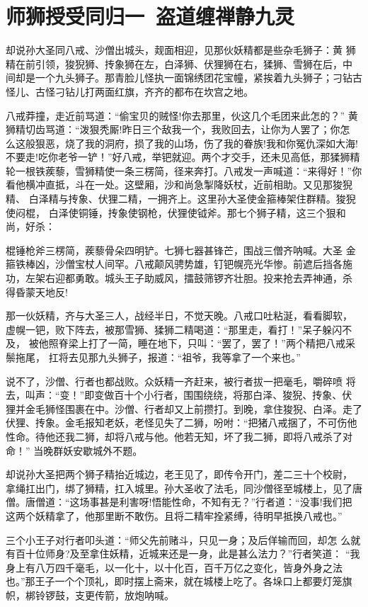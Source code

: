 \chapter{师狮授受同归一~盗道缠禅静九灵}

却说孙大圣同八戒、沙僧出城头，觌面相迎，见那伙妖精都是些杂毛狮子：黄
狮精在前引领，狻猊狮、抟象狮在左，白泽狮、伏狸狮在右，猱狮、雪狮在后，中
间却是一个九头狮子。那青脸儿怪执一面锦绣团花宝幢，紧挨着九头狮子；刁钻古
怪儿、古怪刁钻儿打两面红旗，齐齐的都布在坎宫之地。

八戒莽撞，走近前骂道：“偷宝贝的贼怪!你去那里，伙这几个毛团来此怎的？”
黄狮精切齿骂道：“泼狠秃厮!昨日三个敌我一个，我败回去，让你为人罢了；你怎
么这般狠恶，烧了我的洞府，损了我的山场，伤了我的眷族!我和你冤仇深如大海!
不要走!吃你老爷一铲！”好八戒，举钯就迎。两个才交手，还未见高低，那猱狮精
轮一根铁蒺藜，雪狮精使一条三楞简，径来奔打。八戒发一声喊道：“来得好！”你
看他横冲直抵，斗在一处。这壁厢，沙和尚急掣降妖杖，近前相助。又见那狻猊精、
白泽精与抟象、伏狸二精，一拥齐上。这里孙大圣使金箍棒架住群精。狻猊使闷棍，
白泽使铜锤，抟象使钢枪，伏狸使钺斧。那七个狮子精，这三个狠和尚，好杀：

棍锤枪斧三楞简，蒺藜骨朵四明铲。七狮七器甚锋芒，围战三僧齐呐喊。大圣
金箍铁棒凶，沙僧宝杖人间罕。八戒颠风骋势雄，钉钯幌亮光华惨。前遮后挡各施
功，左架右迎都勇敢。城头王子助威风，擂鼓筛锣齐壮胆。投来抢去弄神通，杀
得昏蒙天地反!

那一伙妖精，齐与大圣三人，战经半日，不觉天晚。八戒口吐粘涎，看看脚软，
虚幌一钯，败下阵去，被那雪狮、猱狮二精喝道：“那里走，看打！”呆子躲闪不及，
被他照脊梁上打了一简，睡在地下，只叫：“罢了，罢了！”两个精把八戒采鬃拖尾，
扛将去见那九头狮子，报道：“祖爷，我等拿了一个来也。”

说不了，沙僧、行者也都战败。众妖精一齐赶来，被行者拔一把毫毛，嚼碎喷
将去，叫声：“变！”即变做百十个小行者，围围绕绕，将那白泽、狻猊、抟象、伏
狸并金毛狮怪围裹在中。沙僧、行者却又上前攒打。到晚，拿住狻猊、白泽。走了
伏狸、抟象。金毛报知老妖，老怪见失了二狮，吩咐：“把猪八戒捆了，不可伤他
性命。待他还我二狮，却将八戒与他。他若无知，坏了我二狮，即将八戒杀了对命！”
当晚群妖安歇城外不题。

却说孙大圣把两个狮子精抬近城边，老王见了，即传令开门，差二三十个校尉，
拿绳扛出门，绑了狮精，扛入城里。孙大圣收了法毛，同沙僧径至城楼上，见了唐
僧。唐僧道：“这场事甚是利害呀!悟能性命，不知有无？”行者道：“没事!我们把
这两个妖精拿了，他那里断不敢伤。且将二精牢拴紧缚，待明早抵换八戒也。”

三个小王子对行者叩头道：“师父先前赌斗，只见一身；及后佯输而回，却怎
么就有百十位师身?及至拿住妖精，近城来还是一身，此是甚么法力？”行者笑道：
“我身上有八万四千毫毛，以一化十，以十化百，百千万亿之变化，皆身外身之法
也。”那王子一个个顶礼，即时摆上斋来，就在城楼上吃了。各垛口上都要灯笼旗
帜，梆铃锣鼓，支更传箭，放炮呐喊。

